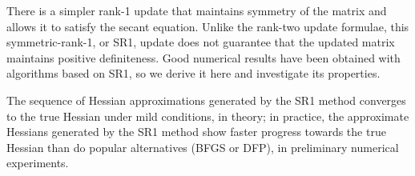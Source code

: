 There is a simpler rank-1
update that maintains symmetry of the matrix and allows it to satisfy the secant equation.
Unlike the rank-two update formulae, this symmetric-rank-1, or SR1, update does not
guarantee that the updated matrix maintains positive definiteness. Good numerical results
have been obtained with algorithms based on SR1, so we derive it here and investigate its
properties.

The sequence of Hessian approximations generated by the SR1 method converges to the true Hessian under mild conditions, in theory; in practice, the approximate Hessians generated by the SR1 method show faster progress towards the true Hessian than do popular alternatives (BFGS or DFP), in preliminary numerical experiments.
